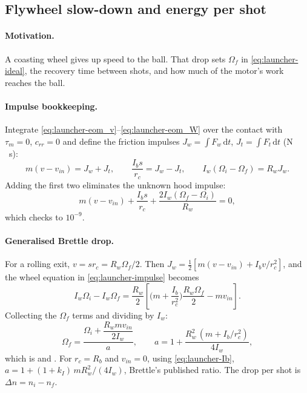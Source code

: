 \subsection{Flywheel slow-down and energy per shot}
\label{sec:launcher:drop}

\paragraph{Motivation.} A coasting wheel gives up speed to the ball. That drop sets $\Omega_f$ in
\eqref{eq:launcher-ideal}, the recovery time between shots, and how much of the motor's work reaches the ball.

\paragraph{Impulse bookkeeping.} Integrate \eqref{eq:launcher-eom_v}--\eqref{eq:launcher-eom_W} over the
contact with $\tau_m = 0$, $c_{rr} = 0$ and define the friction impulses
$J_w = \int F_w\,\mathrm{d}t$, $J_t = \int F_t\,\mathrm{d}t$ (\unit{N\,s}):
\begin{equation}
  m(v - v_{in}) = J_w + J_t, \qquad \frac{I_b s}{r_c} = J_w - J_t, \qquad
  I_w(\Omega_i - \Omega_f) = R_w J_w .
  \label{eq:launcher-impulse}
\end{equation}
Adding the first two eliminates the unknown hood impulse:
\begin{equation}
  m(v - v_{in}) + \frac{I_b s}{r_c} + \frac{2 I_w(\Omega_f - \Omega_i)}{R_w} = 0 ,
  \label{eq:launcher-momhood}
\end{equation}
which  checks to $10^{-9}$.

\paragraph{Generalised Brettle drop.} For a rolling exit, $v = s r_c = R_w\Omega_f/2$. Then
$J_w = \tfrac12[m(v - v_{in}) + I_b v/r_c^2]$, and the wheel equation in \eqref{eq:launcher-impulse} becomes
\begin{equation}
  I_w\Omega_i - I_w\Omega_f = \frac{R_w}{2}\left[\Big(m + \frac{I_b}{r_c^2}\Big)\frac{R_w\Omega_f}{2} - m v_{in}\right].
  \label{eq:launcher-brettlestep}
\end{equation}
Collecting the $\Omega_f$ terms and dividing by $I_w$:
\begin{equation}
  \Omega_f = \frac{\Omega_i + \dfrac{R_w m v_{in}}{2 I_w}}{a}, \qquad
  a = 1 + \frac{R_w^2\,(m + I_b/r_c^2)}{4 I_w},
  \label{eq:launcher-brettle}
\end{equation}
which is  and . For $r_c = R_b$ and $v_{in} = 0$, using
\eqref{eq:launcher-Ib}, $a = 1 + (1 + k_I)\,m R_w^2/(4 I_w)$, Brettle's published ratio. The drop per shot is
$\Delta n = n_i - n_f$.

